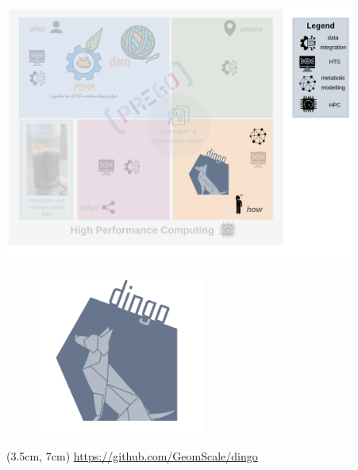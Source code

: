 \documentclass{beamer}
\begin{document}
   \begin{frame}
      \includegraphics[width=115mm]{resources/phd_graphical_abstract-dingo.png}
   \end{frame}


   \begin{frame}
      
      \begin{figure}
         \includegraphics[width=55mm]{../met_nets/resources/dingo5_transparent.png}
      \end{figure}

      \begin{textblock*}{12cm}(3.5cm, 7cm)
         \href{https://github.com/GeomScale/dingo}{https://github.com/GeomScale/dingo}
      \end{textblock*}
   \end{frame}
   \fi 
\end{document}
